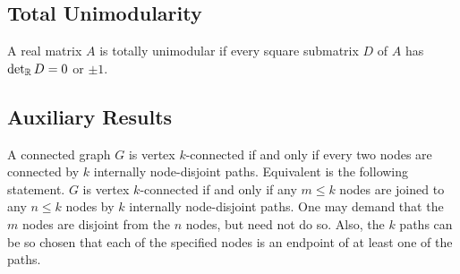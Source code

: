 \begin{definition}[$2$-sum]
  \label{def:2_sum}
\end{definition}

\begin{definition}[$3$-sum]
  \label{def:3_sum}
\end{definition}

\begin{definition}
  \label{def:Delta_sum}
\end{definition}

\begin{definition}[$Y$-sum]
  \label{def:Y_sum}
\end{definition}


\subsection{Total Unimodularity}

\begin{definition}[TU matrix]
  \label{def:tu_matrix}
  A real matrix $A$ is totally unimodular if every square submatrix $D$ of $A$ has $\det_{\mathbb{R}} D = 0$ or $\pm 1$.
\end{definition}



\subsection{Auxiliary Results}

\begin{theorem}
  \label{thm:Menger}
  A connected graph $G$ is vertex $k$-connected if and only if every two nodes are connected by $k$ internally node-disjoint paths.
  Equivalent is the following statement. $G$ is vertex $k$-connected if and only if any $m \leq k$ nodes are joined to any $n \leq k$ nodes by $k$ internally node-disjoint paths.
  One may demand that the $m$ nodes are disjoint from the $n$ nodes, but need not do so.
  Also, the $k$ paths can be so chosen that each of the specified nodes is an endpoint of at least one of the paths.
\end{theorem}

\begin{definition}
  \label{def:Delta_Y_exchange}
\end{definition}

\begin{definition}[gap]
  \label{def:gap}
\end{definition}
